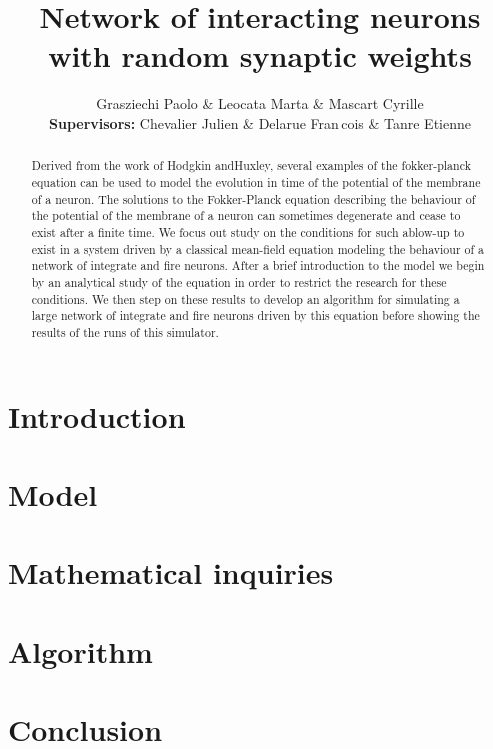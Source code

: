 \documentclass{report}
\title{Network of interacting neurons with random synaptic weights}
\author{Grasziechi Paolo \& Leocata Marta \& Mascart Cyrille\\
		\textbf{Supervisors:} Chevalier Julien \& Delarue Fran\,cois \& Tanre Etienne}
\date{}
\begin{document}
	\maketitle
	\begin{abstract}
		Derived from the work of Hodgkin andHuxley, several examples of the fokker-planck equation can be used to model the evolution in time of the potential of the membrane of a neuron. The solutions to the Fokker-Planck equation describing the behaviour of the potential of the membrane of a neuron can sometimes degenerate and cease to exist after a finite time. We focus out study on the conditions for such ablow-up to exist in a system driven by a classical mean-field equation modeling the behaviour of a network of integrate and fire neurons. After a brief introduction to the model we begin by an analytical study of the equation in order to restrict the research for these conditions. We then step on these results to develop an algorithm for simulating a large network of integrate and fire neurons driven by this equation before showing the results of the runs of this simulator.
	\end{abstract}
	\tableofcontents
	\listoffigures
	\listoftables

	\chapter*{Introduction}
	\chapter{Model}
	\chapter{Mathematical inquiries}
	\chapter{Algorithm}
	\chapter*{Conclusion}
\end{document}
